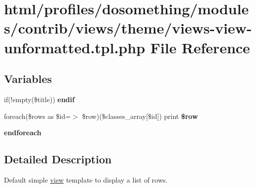 \hypertarget{views-view-unformatted_8tpl_8php}{
\section{html/profiles/dosomething/modules/contrib/views/theme/views-\/view-\/unformatted.tpl.php File Reference}
\label{views-view-unformatted_8tpl_8php}
}
\subsection*{Variables}
\begin{DoxyCompactItemize}
\item 
\hypertarget{views-view-unformatted_8tpl_8php_ade91bc69a503a5ab88f3fdb968225b63}{
if(!empty(\$title)) {\bfseries endif}}
\label{views-view-unformatted_8tpl_8php_ade91bc69a503a5ab88f3fdb968225b63}

\item 
\hypertarget{views-view-unformatted_8tpl_8php_a5877941588b8f814ff02be34df4e004f}{
foreach(\$rows as \$id=$>$ \$row)(\$classes\_\-array\mbox{[}\$id\mbox{]}) print {\bfseries \$row}}
\label{views-view-unformatted_8tpl_8php_a5877941588b8f814ff02be34df4e004f}

\item 
\hypertarget{views-view-unformatted_8tpl_8php_a672d9707ef91db026c210f98cc601123}{
{\bfseries endforeach}}
\label{views-view-unformatted_8tpl_8php_a672d9707ef91db026c210f98cc601123}

\end{DoxyCompactItemize}


\subsection{Detailed Description}
Default simple \hyperlink{classview}{view} template to display a list of rows. 